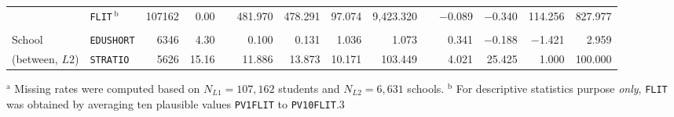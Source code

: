 {\begin{tabular}{llrr c@{\hskip 7.5mm} rrrr c@{\hskip 7.5mm} rrrr}
    & \texttt{FLIT}$\, ^\text{b}$  & 107162 & 0.00  &       & 481.970 & 478.291 & 97.074 & 9,423.320 &       & $-$0.089 & $-$0.340 & 114.256 & 827.977 \\
    &       &       &       &       &       &       &       &       &       &       &       &       &  \\
    School & \texttt{EDUSHORT} & 6346  & 4.30  &       & 0.100 & 0.131 & 1.036 & 1.073 &       & 0.341 & $-$0.188 & $-$1.421 & 2.959 \\
    (between, $L2$) & \texttt{STRATIO} & 5626  & 15.16 &       & 11.886 & 13.873 & 10.171 & 103.449 &       & 4.021 & 25.425 & 1.000 & 100.000 \\
    \bottomrule
    \end{tabular}
}{$^\text{a}$ Missing rates were computed based on $N_{L1} = 107,162$ students and $N_{L2} = 6,631$ schools. $^\text{b}$ For descriptive statistics purpose \emph{only}, \texttt{FLIT} was obtained by averaging ten plausible values \texttt{PV1FLIT} to \texttt{PV10FLIT}.}{3}
